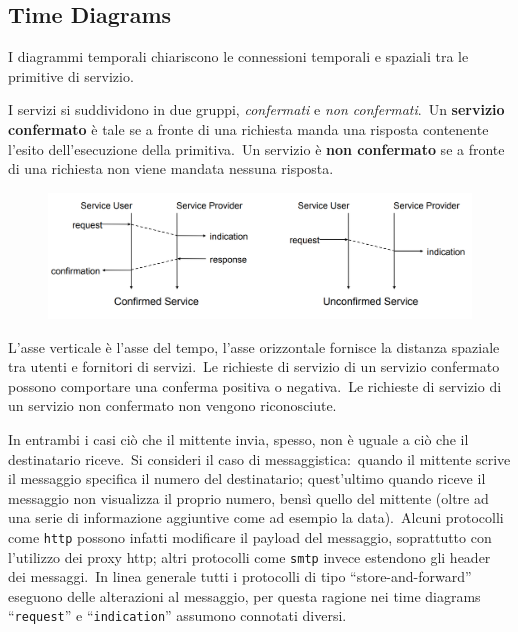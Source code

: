 \subsection{Time Diagrams}

I diagrammi temporali chiariscono le connessioni temporali e spaziali tra le primitive di servizio.

I servizi si suddividono in due gruppi, \textit{confermati} e \textit{non confermati}.\
Un \textbf{servizio confermato} è tale se a fronte di una richiesta manda una risposta contenente l'esito dell'esecuzione della primitiva.\
Un servizio è \textbf{non confermato} se a fronte di una richiesta non viene mandata nessuna risposta.\

\begin{figure}[H]
    \centering
    \includegraphics[width=\textwidth]{immagini/TimeDiagrams.png}
\end{figure}

\noindent L'asse verticale è l'asse del tempo, l'asse orizzontale fornisce la distanza spaziale tra utenti e fornitori di servizi.\
Le richieste di servizio di un servizio confermato possono comportare una conferma positiva o negativa.\
Le richieste di servizio di un servizio non confermato non vengono riconosciute.

In entrambi i casi ciò che il mittente invia, spesso, non è uguale a ciò che il destinatario riceve.\
Si consideri il caso di messaggistica:\ quando il mittente scrive il messaggio specifica il numero del destinatario; quest'ultimo quando riceve il messaggio non visualizza il proprio numero, bensì quello del mittente (oltre ad una serie di informazione aggiuntive come ad esempio la data).\
Alcuni protocolli come \texttt{http} possono infatti modificare il payload del messaggio, soprattutto con l'utilizzo dei proxy http; altri protocolli come \texttt{smtp} invece estendono gli header dei messaggi.\
In linea generale tutti i protocolli di tipo ``store-and-forward'' eseguono delle alterazioni al messaggio, per questa ragione nei time diagrams ``\texttt{request}'' e ``\texttt{indication}'' assumono connotati diversi.\

